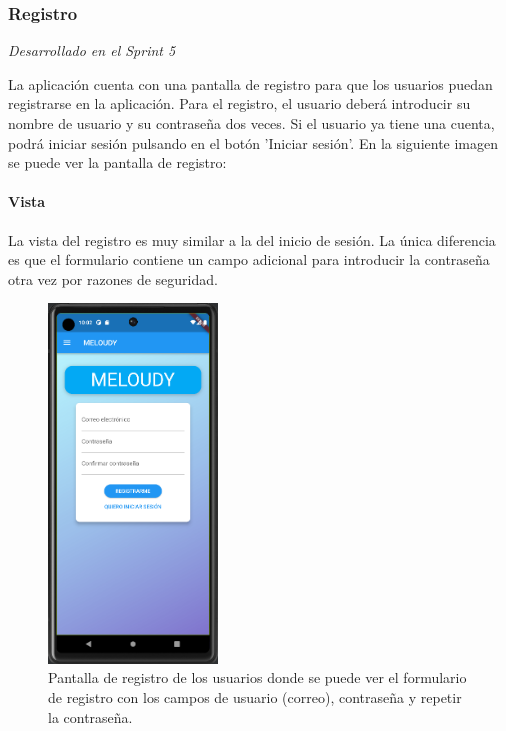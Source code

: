 \subsubsection{Registro}
\textit{Desarrollado en el Sprint 5}
\label{sec:register}

La aplicación cuenta con una pantalla de registro para que los usuarios puedan registrarse en la aplicación. Para el registro, el usuario deberá introducir su nombre de usuario y su contraseña dos veces. Si el usuario ya tiene una cuenta, podrá iniciar sesión pulsando en el botón 'Iniciar sesión'. En la siguiente imagen se puede ver la pantalla de registro:



\paragraph*{Vista}
La vista del registro es muy similar a la del inicio de sesión. La única diferencia es que el formulario contiene un campo adicional para introducir la contraseña otra vez por razones de seguridad.

\begin{figure}[H]
  \centering
  \includegraphics[width=0.4\textwidth]{imagenes/c7/registro.png}
  \caption{Pantalla de registro de los usuarios donde se puede ver el formulario de registro con los campos de usuario (correo), contraseña y repetir la contraseña.}
  \label{fig:register}
\end{figure}


